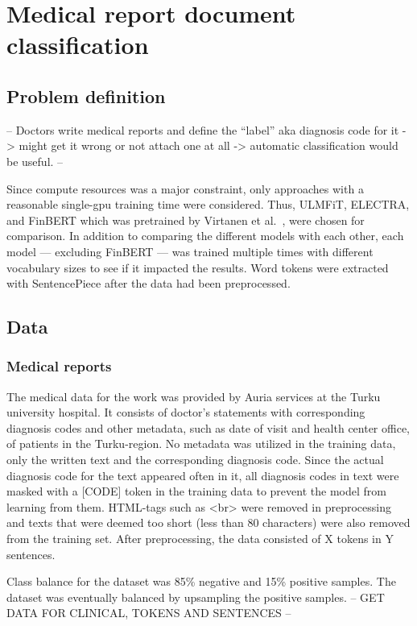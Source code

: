\chapter{Medical report document classification} \label{Medical report document classification}

\section{Problem definition} \label{Problem definition}

-- Doctors write medical reports and define the ``label'' aka diagnosis code for it -> might get it wrong or not attach one at all -> automatic classification would be useful. --


Since compute resources was a major constraint, only approaches with a reasonable single-gpu training time were considered.
Thus, ULMFiT, ELECTRA, and FinBERT which was pretrained by Virtanen et al.~\cite{virtanen2019}, were chosen for comparison.
In addition to comparing the different models with each other, each model --- excluding FinBERT --- was trained multiple times with different vocabulary sizes to see if it impacted the results.
Word tokens were extracted with SentencePiece after the data had been preprocessed.

\section{Data} \label{Data}
\subsection{Medical reports}\label{Medical reports}
The medical data for the work was provided by Auria services at the Turku university hospital.
It consists of doctor's statements with corresponding diagnosis codes and other metadata, such as date of visit and health center office, of patients in the Turku-region.
No metadata was utilized in the training data, only the written text and the corresponding diagnosis code.
Since the actual diagnosis code for the text appeared often in it, all diagnosis codes in text were masked with a [CODE] token in the training data to prevent the model from learning from them.
HTML-tags such as <br> were removed in preprocessing and texts that were deemed too short (less than 80 characters) were also removed from the training set.
After preprocessing, the data consisted of X tokens in Y sentences.

Class balance for the dataset was 85\% negative and 15\% positive samples.
The dataset was eventually balanced by upsampling the positive samples.
-- GET DATA FOR CLINICAL, TOKENS AND SENTENCES --

